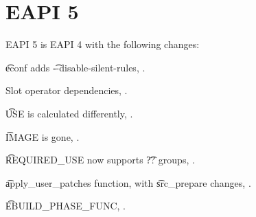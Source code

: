\section*{EAPI 5}

EAPI 5 is EAPI 4 with the following changes:

\begin{compactitem}
\item \t{econf} adds \t{-{}-disable-silent-rules}, .
\item Slot operator dependencies, .
\item \t{USE} is calculated differently, .
\item \t{IMAGE} is gone, .
\item \t{REQUIRED\_USE} now supports \t{??} groups, .
\item \t{apply\_user\_patches} function, with \t{src\_prepare} changes,
    .
\item \t{EBUILD\_PHASE\_FUNC}, .
\end{compactitem}



